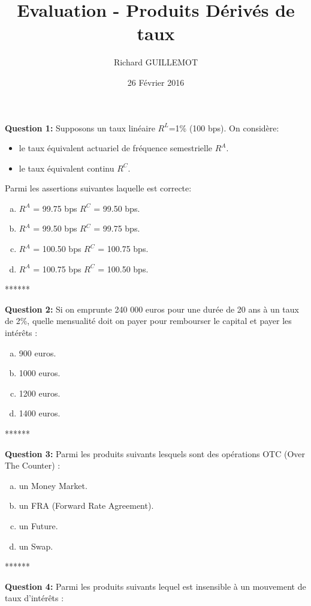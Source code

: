 \documentclass{article}
\newcommand{\indentitem}{\setlength\itemindent{25pt}}
\begin{document}
\title{Evaluation - Produits Dérivés de taux}
\date{26 Février 2016}
\author{Richard GUILLEMOT}
\maketitle

\textbf{Question 1:} Supposons un taux linéaire $R^L$=1\% (100 bps). On considère: 
\begin{itemize}
	\indentitem \item le taux équivalent actuariel de fréquence semestrielle $R^A$.
	\indentitem \item le taux équivalent continu $R^C$.
\end{itemize}
\vspace{0.2cm}
Parmi les assertions suivantes laquelle est correcte:
\begin{enumerate}[a)]
\indentitem \item $R^A$ = 99.75 bps $R^C$ = 99.50 bps.
\indentitem \item $R^A$ = 99.50 bps $R^C$ = 99.75 bps.
\indentitem \item $R^A$ = 100.50 bps $R^C$ = 100.75 bps.
\indentitem \item $R^A$ = 100.75 bps $R^C$ = 100.50 bps.
\end{enumerate}
\smallskip
\centerline{******}
\smallskip
\textbf{Question 2:}
Si on emprunte 240 000 euros pour une durée de 20 ans à un taux de 2\%, quelle mensualité doit on payer pour rembourser le capital et payer les intérêts :
\begin{enumerate}[a)]
\indentitem \item 900 euros.
\indentitem \item 1000 euros.
\indentitem \item 1200 euros.
\indentitem \item 1400 euros.
\end{enumerate}
\smallskip
\centerline{******}
\smallskip
\textbf{Question 3:}
Parmi les produits suivants lesquels sont des opérations OTC (Over The Counter) :
\begin{enumerate}[a)]
\indentitem \item un Money Market.
\indentitem \item un FRA (Forward Rate Agreement).
\indentitem \item un Future.
\indentitem \item un Swap.
\end{enumerate}
\newpage
\smallskip
\centerline{******}
\smallskip
\textbf{Question 4:}
Parmi les produits suivants lequel est insensible à un mouvement de taux d’intérêts :
\end{document}

